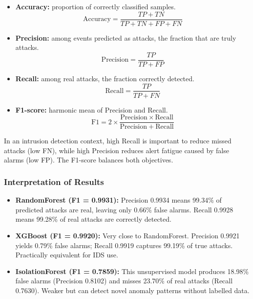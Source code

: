 \documentclass[12pt,a4paper]{report}
\begin{document}
\begin{itemize}[leftmargin=1.5em]
  \item \textbf{Accuracy:} proportion of correctly classified samples.
    \begin{equation}
      \mathrm{Accuracy} = \frac{TP + TN}{TP + TN + FP + FN}
    \end{equation}
  \item \textbf{Precision:} among events predicted as attacks, the fraction
    that are truly attacks.
    \begin{equation}
      \mathrm{Precision} = \frac{TP}{TP + FP}
    \end{equation}
  \item \textbf{Recall:} among real attacks, the fraction correctly detected.
    \begin{equation}
      \mathrm{Recall} = \frac{TP}{TP + FN}
    \end{equation}
  \item \textbf{F1-score:} harmonic mean of Precision and Recall.
    \begin{equation}
      \mathrm{F1} = 2 \times \frac{\mathrm{Precision} \times \mathrm{Recall}}
                                   {\mathrm{Precision} + \mathrm{Recall}}
    \end{equation}
\end{itemize}

In an intrusion detection context, high Recall is important to reduce missed
attacks (low FN), while high Precision reduces alert fatigue caused by false
alarms (low FP). The F1-score balances both objectives.

\subsubsection{Interpretation of Results}

\begin{itemize}[leftmargin=1.5em]
  \item \textbf{RandomForest (F1 = 0.9931):} Precision 0.9934 means 99.34\%
    of predicted attacks are real, leaving only 0.66\% false alarms. Recall
    0.9928 means 99.28\% of real attacks are correctly detected.
  \item \textbf{XGBoost (F1 = 0.9920):} Very close to RandomForest. Precision
    0.9921 yields 0.79\% false alarms; Recall 0.9919 captures 99.19\% of true
    attacks. Practically equivalent for IDS use.
  \item \textbf{IsolationForest (F1 = 0.7859):} This unsupervised model
    produces 18.98\% false alarms (Precision 0.8102) and misses 23.70\% of
    real attacks (Recall 0.7630). Weaker but can detect novel anomaly patterns
    without labelled data.
\end{itemize}
\end{document}
